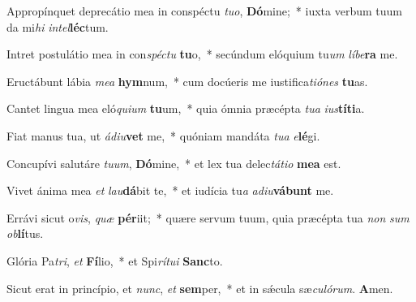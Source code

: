 \item Appropínquet deprecátio mea in conspéctu \textit{tu}\textit{o}, \textbf{Dó}mine;~* iuxta verbum tuum da mi\textit{hi} \textit{in}\textit{tel}\textbf{léc}tum.

\item Intret postulátio mea in con\textit{spéc}\textit{tu} \textbf{tu}o,~* secúndum elóquium tu\textit{um} \textit{lí}\textit{be}\textbf{ra} me.

\item Eructábunt lábia \textit{me}\textit{a} \textbf{hym}num,~* cum docúeris me iustifica\textit{ti}\textit{ó}\textit{nes} \textbf{tu}as.

\item Cantet lingua mea eló\textit{qui}\textit{um} \textbf{tu}um,~* quia ómnia præcépta \textit{tu}\textit{a} \textit{ius}\textbf{tí}\textbf{ti}a.

\item Fiat manus tua, ut \textit{ád}\textit{iu}\textbf{vet} me,~* quóniam mandáta \textit{tu}\textit{a} \textit{e}\textbf{lé}gi.

\item Concupívi salutáre \textit{tu}\textit{um}, \textbf{Dó}mine,~* et lex tua delec\textit{tá}\textit{ti}\textit{o} \textbf{me}\textbf{a} est.

\item Vivet ánima mea \textit{et} \textit{lau}\textbf{dá}bit te,~* et iudícia tu\textit{a} \textit{ad}\textit{iu}\textbf{vá}\textbf{bunt} me.

\item Errávi sicut o\textit{vis}, \textit{quæ} \textbf{pér}iit;~* quære servum tuum, quia præcépta tua \textit{non} \textit{sum} \textit{ob}\textbf{lí}tus.

\item Glória Pa\textit{tri}, \textit{et} \textbf{Fí}lio,~* et Spi\textit{rí}\textit{tu}\textit{i} \textbf{Sanc}to.

\item Sicut erat in princípio, et \textit{nunc}, \textit{et} \textbf{sem}per,~* et in sǽcula sæ\textit{cu}\textit{ló}\textit{rum}. \textbf{A}men.